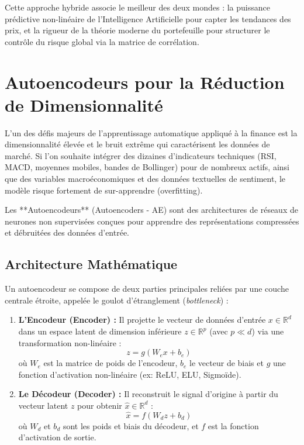 Cette approche hybride associe le meilleur des deux mondes : la puissance prédictive non-linéaire de l'Intelligence Artificielle pour capter les tendances des prix, et la rigueur de la théorie moderne du portefeuille pour structurer le contrôle du risque global via la matrice de corrélation.

\section{Autoencodeurs pour la Réduction de Dimensionnalité}
L'un des défis majeurs de l'apprentissage automatique appliqué à la finance est la dimensionnalité élevée et le bruit extrême qui caractérisent les données de marché. Si l'on souhaite intégrer des dizaines d'indicateurs techniques (RSI, MACD, moyennes mobiles, bandes de Bollinger) pour de nombreux actifs, ainsi que des variables macroéconomiques et des données textuelles de sentiment, le modèle risque fortement de sur-apprendre (overfitting). 

Les **Autoencodeurs** (Autoencoders - AE) sont des architectures de réseaux de neurones non supervisées conçues pour apprendre des représentations compressées et débruitées des données d'entrée. 

\subsection{Architecture Mathématique}
Un autoencodeur se compose de deux parties principales reliées par une couche centrale étroite, appelée le goulot d'étranglement (\textit{bottleneck}) :
\begin{enumerate}
    \item \textbf{L'Encodeur (Encoder) :} Il projette le vecteur de données d'entrée $x \in \mathbb{R}^d$ dans un espace latent de dimension inférieure $z \in \mathbb{R}^p$ (avec $p \ll d$) via une transformation non-linéaire :
    \begin{equation}
        z = g(W_e x + b_e)
    \end{equation}
    où $W_e$ est la matrice de poids de l'encodeur, $b_e$ le vecteur de biais et $g$ une fonction d'activation non-linéaire (ex: ReLU, ELU, Sigmoïde).
    \item \textbf{Le Décodeur (Decoder) :} Il reconstruit le signal d'origine à partir du vecteur latent $z$ pour obtenir $\hat{x} \in \mathbb{R}^d$ :
    \begin{equation}
        \hat{x} = f(W_d z + b_d)
    \end{equation}
    où $W_d$ et $b_d$ sont les poids et biais du décodeur, et $f$ est la fonction d'activation de sortie.
\end{enumerate}

